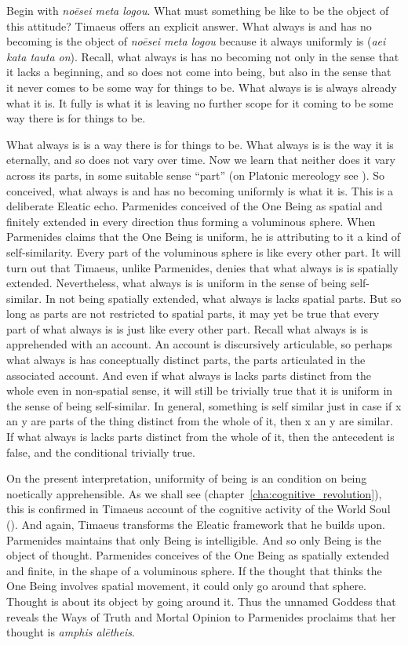 Begin with \emph{noēsei meta logou}. What must something be like to be the object of this attitude? Timaeus offers an explicit answer. What always is and has no becoming is the object of \emph{noēsei meta logou} because it always uniformly is (\emph{aei kata tauta on}). Recall, what always is has no becoming not only in the sense that it lacks a beginning, and so does not come into being, but also in the sense that it never comes to be some way for things to be. What always is is always already what it is. It fully is what it is leaving no further scope for it coming to be some way there is for things to be. 

What always is is a way there is for things to be. What always is is the way it is eternally, and so does not vary over time. Now we learn that neither does it vary across its parts, in some suitable sense ``part'' (on Platonic mereology see \citealt{Harte:2002tl}). So conceived, what always is and has no becoming uniformly is what it is. This is a deliberate Eleatic echo. Parmenides conceived of the One Being as spatial and finitely extended in every direction thus forming a voluminous sphere. When Parmenides claims that the One Being is uniform, he is attributing to it a kind of self-similarity. Every part of the voluminous sphere is like every other part. It will turn out that Timaeus, unlike Parmenides, denies that what always is is spatially extended. Nevertheless, what always is is uniform in the sense of being self-similar. In not being spatially extended, what always is lacks spatial parts. But so long as parts are not restricted to spatial parts, it may yet be true that every part of what always is is just like every other part. Recall what always is is apprehended with an account. An account is discursively articulable, so perhaps what always is has conceptually distinct parts, the parts articulated in the associated account. And even if what always is lacks parts distinct from the whole even in non-spatial sense, it will still be trivially true that it is uniform in the sense of being self-similar. In general, something is self similar just in case if x an y are parts of the thing distinct from the whole of it, then x an y are similar. If what always is lacks parts distinct from the whole of it, then the antecedent is false, and the conditional trivially true.

On the present interpretation, uniformity of being is an condition on being noetically apprehensible. As we shall see (chapter~\ref{cha:cognitive_revolution}), this is confirmed in Timaeus account of the cognitive activity of the World Soul (). And again, Timaeus transforms the Eleatic framework that he builds upon. Parmenides maintains that only Being is intelligible. And so only Being is the object of thought. Parmenides conceives of the One Being as spatially extended and finite, in the shape of a voluminous sphere. If the thought that thinks the One Being involves spatial movement, it could only go around that sphere. Thought is about its object by going around it. Thus the unnamed Goddess that reveals the Ways of Truth and Mortal Opinion to Parmenides proclaims that her thought is \emph{amphis alētheis}.

